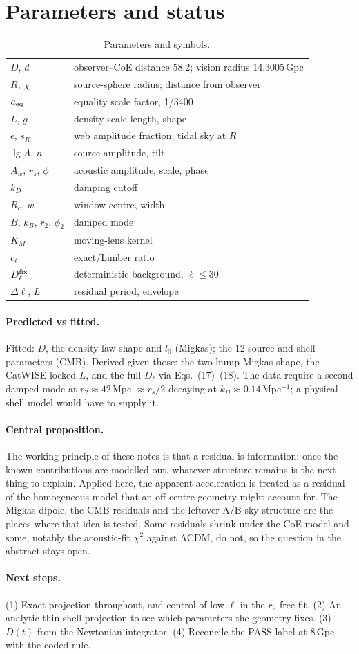\documentclass[10pt,twocolumn]{article}
\begin{document}
\section{Parameters and status}
\begin{table}[htbp]\centering\small\caption{Parameters and symbols.}\label{tab:par}\begin{tabular}{@{}p{}p{}@{}}\toprule
$D$, $d$ & observer--CoE distance 58.2; vision radius 14.3005\,Gpc\\
$R$, $\chi$ & source-sphere radius; distance from observer\\
$a_{\rm eq}$ & equality scale factor, 1/3400\\
$L$, $g$ & density scale length, shape\\
$\epsilon$, $s_R$ & web amplitude fraction; tidal sky at $R$\\
$\lg A$, $n$ & source amplitude, tilt\\
$A_w$, $r_s$, $\phi$ & acoustic amplitude, scale, phase\\
$k_D$ & damping cutoff\\
$R_c$, $w$ & window centre, width\\
$B$, $k_B$, $r_2$, $\phi_2$ & damped mode\\
$K_M$ & moving-lens kernel\\
$c_\ell$ & exact/Limber ratio\\
$D^{\rm fix}_\ell$ & deterministic background, $\ell\le30$\\
$\Delta\ell$, $L$ & residual period, envelope\\\bottomrule
\end{tabular}\end{table}
\paragraph{Predicted vs fitted.} Fitted: $D$, the density-law shape and $l_0$ (Migkas); the 12 source and shell parameters (CMB). Derived given those: the two-hump Migkas shape, the CatWISE-locked $L$, and the full $D_\ell$ via Eqs.~(17)--(18). The data require a second damped mode at $r_2\approx42$\,Mpc $\approx r_s/2$ decaying at $k_B\approx0.14$\,Mpc$^{-1}$; a physical shell model would have to supply it.
\paragraph{Central proposition.} The working principle of these notes is that a residual is information: once the known contributions are modelled out, whatever structure remains is the next thing to explain. Applied here, the apparent acceleration is treated as a residual of the homogeneous model that an off-centre geometry might account for. The Migkas dipole, the CMB residuals and the leftover A/B sky structure are the places where that idea is tested. Some residuals shrink under the CoE model and some, notably the acoustic-fit $\chi^2$ against ΛCDM, do not, so the question in the abstract stays open.

\paragraph{Next steps.} (1) Exact projection throughout, and control of low $\ell$ in the $r_2$-free fit. (2) An analytic thin-shell projection to see which parameters the geometry fixes. (3) $D(t)$ from the Newtonian integrator. (4) Reconcile the PASS label at 8\,Gpc with the coded rule.
\end{document}
